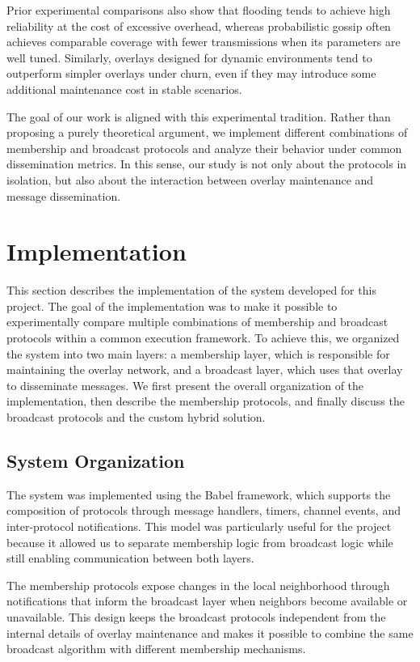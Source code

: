 \documentclass[sigconf,a4paper]{acmart}
\begin{document}
Prior experimental comparisons also show that flooding tends to achieve
high reliability at the cost of excessive overhead, whereas probabilistic
gossip often achieves comparable coverage with fewer transmissions when
its parameters are well tuned. Similarly, overlays designed for dynamic
environments tend to outperform simpler overlays under churn, even if
they may introduce some additional maintenance cost in stable scenarios.

The goal of our work is aligned with this experimental tradition.
Rather than proposing a purely theoretical argument, we implement
different combinations of membership and broadcast protocols and analyze
their behavior under common dissemination metrics. In this sense, our
study is not only about the protocols in isolation, but also about the
interaction between overlay maintenance and message dissemination.

\section{Implementation}
\label{sec:implementation}

This section describes the implementation of the system developed for
this project. The goal of the implementation was to make it possible to
experimentally compare multiple combinations of membership and broadcast
protocols within a common execution framework. To achieve this, we
organized the system into two main layers: a membership layer, which is
responsible for maintaining the overlay network, and a broadcast layer,
which uses that overlay to disseminate messages. We first present the
overall organization of the implementation, then describe the membership
protocols, and finally discuss the broadcast protocols and the custom
hybrid solution.

\subsection{System Organization}

The system was implemented using the Babel framework, which supports the
composition of protocols through message handlers, timers, channel
events, and inter-protocol notifications. This model was particularly
useful for the project because it allowed us to separate membership
logic from broadcast logic while still enabling communication between
both layers.

The membership protocols expose changes in the local neighborhood through
notifications that inform the broadcast layer when neighbors become
available or unavailable. This design keeps the broadcast protocols
independent from the internal details of overlay maintenance and makes
it possible to combine the same broadcast algorithm with different
membership mechanisms.
\end{document}
